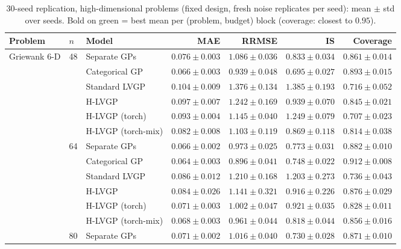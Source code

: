 \begin{table}[htbp]
\centering
\small
%
\setlength{\tabcolsep}{3pt}
\caption{30-seed replication, high-dimensional problems (fixed design, fresh noise replicates per seed): mean $\pm$ std over seeds. Bold on green = best mean per (problem, budget) block (coverage: closest to $0.95$).}
\label{tab:seeds_hd}
\begin{tabular}{lllrrrr}
\toprule
Problem & $n$ & Model & MAE & RRMSE & IS & Coverage \\
\midrule
\multirow{30}{*}{Griewank 6-D} & \multirow{6}{*}{48} & Separate GPs & $0.076 \pm 0.003$ & $1.086 \pm 0.036$ & $0.833 \pm 0.034$ & $0.861 \pm 0.014$ \\
 &  & Categorical GP & \colorbox{green!20}{\boldmath$0.066 \pm 0.003$} & \colorbox{green!20}{\boldmath$0.939 \pm 0.048$} & \colorbox{green!20}{\boldmath$0.695 \pm 0.027$} & \colorbox{green!20}{\boldmath$0.893 \pm 0.015$} \\
 &  & Standard LVGP & $0.104 \pm 0.009$ & $1.376 \pm 0.134$ & $1.385 \pm 0.193$ & $0.716 \pm 0.052$ \\
 &  & H-LVGP & $0.097 \pm 0.007$ & $1.242 \pm 0.169$ & $0.939 \pm 0.070$ & $0.845 \pm 0.021$ \\
 &  & H-LVGP (torch) & $0.093 \pm 0.004$ & $1.145 \pm 0.040$ & $1.249 \pm 0.079$ & $0.707 \pm 0.023$ \\
 &  & H-LVGP (torch-mix) & $0.082 \pm 0.008$ & $1.103 \pm 0.119$ & $0.869 \pm 0.118$ & $0.814 \pm 0.038$ \\
\cmidrule(lr){2-7}
 & \multirow{6}{*}{64} & Separate GPs & $0.066 \pm 0.002$ & $0.973 \pm 0.025$ & $0.773 \pm 0.031$ & $0.882 \pm 0.010$ \\
 &  & Categorical GP & \colorbox{green!20}{\boldmath$0.064 \pm 0.003$} & \colorbox{green!20}{\boldmath$0.896 \pm 0.041$} & \colorbox{green!20}{\boldmath$0.748 \pm 0.022$} & \colorbox{green!20}{\boldmath$0.912 \pm 0.008$} \\
 &  & Standard LVGP & $0.086 \pm 0.012$ & $1.210 \pm 0.168$ & $1.203 \pm 0.273$ & $0.736 \pm 0.043$ \\
 &  & H-LVGP & $0.084 \pm 0.026$ & $1.141 \pm 0.321$ & $0.916 \pm 0.226$ & $0.876 \pm 0.029$ \\
 &  & H-LVGP (torch) & $0.071 \pm 0.003$ & $1.002 \pm 0.047$ & $0.921 \pm 0.035$ & $0.828 \pm 0.011$ \\
 &  & H-LVGP (torch-mix) & $0.068 \pm 0.003$ & $0.961 \pm 0.044$ & $0.818 \pm 0.044$ & $0.856 \pm 0.016$ \\
\cmidrule(lr){2-7}
 & \multirow{6}{*}{80} & Separate GPs & $0.071 \pm 0.002$ & $1.016 \pm 0.040$ & $0.730 \pm 0.028$ & $0.871 \pm 0.010$ \\

\end{tabular}
\end{table}
